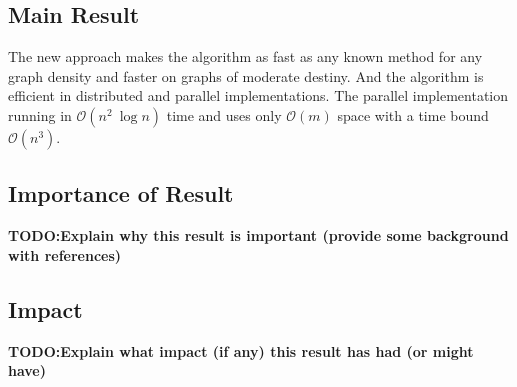 \subsection*{Main Result}
    The new approach makes the algorithm as fast as any known method for any
    graph density and faster on graphs of moderate destiny. And the algorithm
    is efficient in distributed and parallel implementations. The parallel
    implementation running in $\mathcal{O} (n^2\ \log{n})$ time and uses only
    $\mathcal{O}(m)$ space with a time bound $\mathcal{O}(n^3)$.

\subsection*{Importance of Result}
    \bf{TODO:Explain why this result is important (provide some background with
    references)}

\subsection*{Impact}
    \bf{TODO:Explain what impact (if any) this result has had (or might have)}
%

